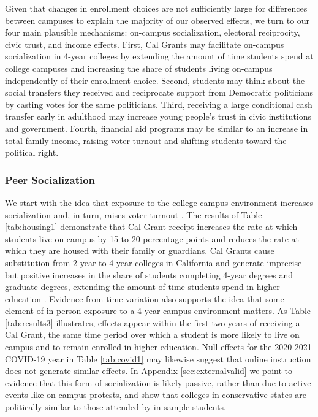 \documentclass[12pt,letterpaper,oneside]{book}
\begin{document}
Given that changes in enrollment choices are not sufficiently large for differences between campuses to explain the majority of our observed effects, we turn to our four main plausible mechanisms: on-campus socialization, electoral reciprocity, civic trust, and income effects. First, Cal Grants may facilitate on-campus socialization in 4-year colleges by extending the amount of time students spend at college campuses and increasing the share of students living on-campus independently of their enrollment choice. Second, students may think about the social transfers they received and reciprocate support from Democratic politicians by casting votes for the same politicians. Third, receiving a large conditional cash transfer early in adulthood may increase young people's trust in civic institutions and government. Fourth, financial aid programs may be similar to an increase in total family income, raising voter turnout and shifting students toward the political right.

\subsubsection{Peer Socialization}

We start with the idea that exposure to the college campus environment increases socialization and, in turn, raises voter turnout \citep{persson_education_2015,firoozi_effect_2023}. The results of Table \ref{tab:housing1} demonstrate that Cal Grant receipt increases the rate at which students live on campus by 15 to 20 percentage points and reduces the rate at which they are housed with their family or guardians. Cal Grants cause substitution from 2-year to 4-year colleges in California and generate imprecise but positive increases in the share of students completing 4-year degrees and graduate degrees, extending the amount of time students spend in higher education \citep{bettinger_long-run_2019}. Evidence from time variation also supports the idea that some element of in-person exposure to a 4-year campus environment matters. As Table \ref{tab:results3} illustrates, effects appear within the first two years of receiving a Cal Grant, the same time period over which a student is more likely to live on campus and to remain enrolled in higher education. Null effects for the 2020-2021 COVID-19 year in Table \ref{tab:covid1} may likewise suggest that online instruction does not generate similar effects. In Appendix \ref{sec:externalvalid} we point to evidence that this form of socialization is likely passive, rather than due to active events like on-campus protests, and show that colleges in conservative states are politically similar to those attended by in-sample students.
\end{document}
